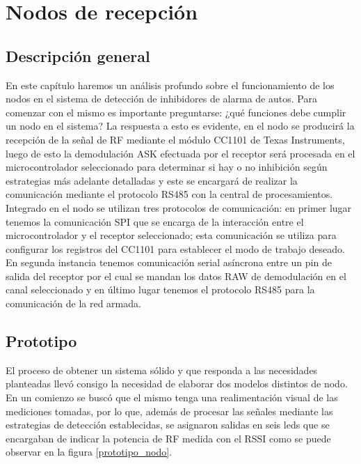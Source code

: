 \chapter{Nodos de recepción} \par 

\section{Descripción general}

En este capítulo haremos un análisis profundo sobre el funcionamiento de los nodos en el sistema de detección de inhibidores
de alarma de autos. Para comenzar con el mismo es importante preguntarse: ¿qué funciones debe cumplir un nodo en el sistema?
La respuesta a esto es evidente, en el nodo se producirá la recepción de la señal de RF mediante el módulo CC1101 de Texas 
Instruments, luego de esto la demodulación ASK efectuada por el receptor será procesada en el microcontrolador seleccionado
para determinar si hay o no inhibición según estrategias más adelante detalladas y este se encargará de realizar la 
comunicación mediante el protocolo RS485 con la central de procesamientos. Integrado en el nodo se utilizan tres protocolos 
de comunicación: en primer lugar tenemos la comunicación SPI que se encarga de la interacción entre el microcontrolador y 
el receptor seleccionado; esta comunicación se utiliza para configurar los registros del CC1101 para establecer el modo de
trabajo deseado. En segunda instancia tenemos comunicación serial asíncrona entre un pin de salida del receptor por el cual 
se mandan los datos RAW de demodulación en el canal seleccionado y en último lugar tenemos el protocolo RS485 para la comunicación
de la red armada. 

\section{Prototipo}

El proceso de obtener un sistema sólido y que responda a las necesidades planteadas llevó consigo la necesidad de elaborar
dos modelos distintos de nodo. En un comienzo se buscó que el mismo tenga una realimentación visual de las mediciones tomadas,
por lo que, además de procesar las señales mediante las estrategias de detección establecidas, se asignaron salidas en seis leds
que se encargaban de indicar la potencia de RF medida con el RSSI como se puede observar en la figura \ref{prototipo_nodo}. \par 

